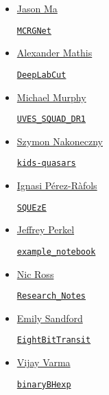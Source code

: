 \documentclass[11pt,a4paper]{article}
\begin{document}
\begin{itemize}
\item \href{https://github.com/myinxd}{Jason Ma}
  \begin{itemize}
    \href{https://github.com/myinxd/mcrgnet}{\tt MCRGNet}
  \end{itemize}

\item \href{https://github.com/AlexEMG}{Alexander Mathis}
  \begin{itemize}
    \href{https://github.com/AlexEMG/DeepLabCut}{\tt DeepLabCut} 
  \end{itemize}

\item \href{https://github.com/MTMurphy77/}{Michael Murphy}
  \begin{itemize}
    \href{https://github.com/MTMurphy77/UVES_SQUAD_DR1}{\tt UVES\_SQUAD\_DR1}
  \end{itemize}

  \item \href{https://github.com/snakoneczny}{Szymon Nakoneczny}
  \begin{itemize}
    \href{https://github.com/snakoneczny/kids-quasars}{\tt kids-quasars}
  \end{itemize}

\item \href{https://github.com/iprafols/}{Ignasi P\'{e}rez-R\`{a}fols}
  \begin{itemize}
    \href{https://github.com/iprafols/SQUEzE}{\tt SQUEzE}
  \end{itemize}

\item \href{https://github.com/jperkel/}{Jeffrey Perkel}
  \begin{itemize}
    \href{https://github.com/jperkel/example_notebook}{\tt example\_notebook}
  \end{itemize}

\item \href{https://github.com/d80b2t}{Nic Ross}
  \begin{itemize}
    \href{https://github.com/d80b2t/Research\_Notes}{\tt Research\_Notes}
  \end{itemize}

\item \href{https://github.com/esandford}{Emily Sandford}
  \begin{itemize}
    \href{https://github.com/esandford/EightBitTransit}{\tt EightBitTransit}
  \end{itemize}

\item \href{https://github.com/vijayvarma392}{Vijay Varma}
  \begin{itemize}
    \href{https://github.com/vijayvarma392/binaryBHexp}{\tt binaryBHexp}
  \end{itemize}


\end{itemize}
\end{document}
